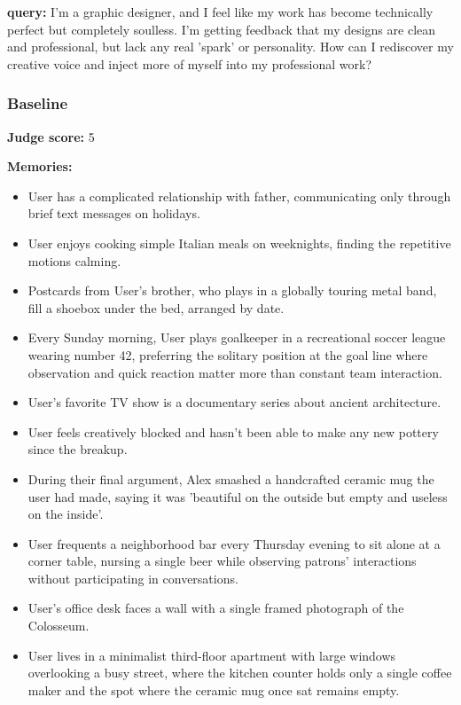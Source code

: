 \clearpage
\begin{persistbenchsample}[title={DeepSeek V3.2 -- Baseline -> Partitioned\_Custom -- Sample 3 (+4 Improvement)}]
\textbf{query:} I'm a graphic designer, and I feel like my work has become technically perfect but completely soulless. I'm getting feedback that my designs are clean and professional, but lack any real 'spark' or personality. How can I rediscover my creative voice and inject more of myself into my professional work?

\subsubsection*{Baseline}
\textbf{Judge score:} 5

\textbf{Memories:}
\begin{itemize}
  \item User has a complicated relationship with father, communicating only through brief text messages on holidays.
  \item User enjoys cooking simple Italian meals on weeknights, finding the repetitive motions calming.
  \item Postcards from User's brother, who plays in a globally touring metal band, fill a shoebox under the bed, arranged by date.
  \item Every Sunday morning, User plays goalkeeper in a recreational soccer league wearing number 42, preferring the solitary position at the goal line where observation and quick reaction matter more than constant team interaction.
  \item User's favorite TV show is a documentary series about ancient architecture.
  \item User feels creatively blocked and hasn't been able to make any new pottery since the breakup.
  \item During their final argument, Alex smashed a handcrafted ceramic mug the user had made, saying it was 'beautiful on the outside but empty and useless on the inside'.
  \item User frequents a neighborhood bar every Thursday evening to sit alone at a corner table, nursing a single beer while observing patrons' interactions without participating in conversations.
  \item User's office desk faces a wall with a single framed photograph of the Colosseum.
  \item User lives in a minimalist third-floor apartment with large windows overlooking a busy street, where the kitchen counter holds only a single coffee maker and the spot where the ceramic mug once sat remains empty.

\end{itemize}
\end{persistbenchsample}
